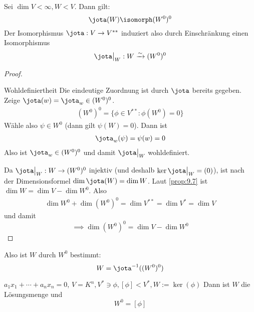 \documentclass{mycourse}
\begin{document}
\begin{kor}
\label{kor:9.8}
Sei $\dim V<\infty, W<V$. Dann gilt:
\[
\jota(W)\isomorph(W^0)^0
\]
Der Isomorphismus $\jota: V\to V^{**}$ induziert also durch Einschränkung einen Isomorphismus
\[
	\jota\big|_W: W\xrightarrow{\sim} (W^0)^0
\]
\begin{proof}
	\begin{seg}{Wohldefiniertheit}
		Die eindeutige Zuordnung ist durch $\jota$ bereits gegeben.
		Zeige $\jota(w)=\jota_w\in(W^0)^0$.
\begin{align*}
(W^0)^0=\{\phi\in V^{**}:\phi(W^0)=0\}
\end{align*}
Wähle also $\psi\in W^0$ (dann gilt $\psi(W)=0$).
Dann ist
\begin{align*}
\jota_w(\psi)=\psi(w)=0
\end{align*}
Also ist $\jota_w\in (W^0)^0$ und damit $\jota\big|_W$ wohldefiniert.
\end{seg}

Da $\jota\big|_W:W\to (W^{0})^0$ injektiv (und deshalb $\ker\jota\big|_W=(0)$), ist nach der Dimensionsformel $\dim\jota(W) = \dim W$.
Laut \ref{prop:9.7} ist $\dim W=\dim V-\dim W^0$.
Also
\begin{align*}
\dim W^0 + \dim (W^0)^0 = \dim V^{**} = \dim V^* = \dim V
\end{align*}
und damit
\[
\implies \dim(W^0)^0=\dim V- \dim W^0
\]
\end{proof}
\begin{note}
Also ist $W$ durch $W^0$ bestimmt:
\[
W=\jota^{-1}((W^0)^0)
\]
\end{note}
\end{kor}


\begin{ex}
$a_1x_1+\dotsb+a_nx_n=0$, $V=K^n, V^*\ni \phi, [\phi]<V^*, W:=\ker(\phi)$ %
Dann ist $W$ die Lösungsmenge und
\[
W^0=[\phi]
\]
\end{ex}
\end{document}
